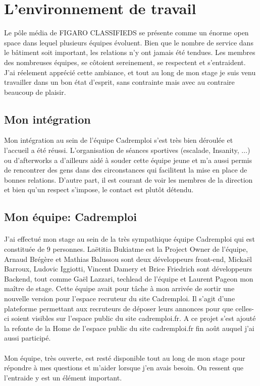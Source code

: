 \section{L'environnement de travail}
Le pôle média de FIGARO CLASSIFIEDS se présente comme un énorme open space dans lequel plusieurs équipes évoluent.
Bien que le nombre de service dans le bâtiment soit important, les relations n'y ont jamais été tendues.
Les membres des nombreuses équipes, se côtoient sereinement, se respectent et s'entraident.
J'ai réelement apprécié cette ambiance, et tout au long de mon stage je suis venu travailler dans un bon état d'esprit, sans contrainte mais avec au contraire beaucoup de plaisir.

\subsection{Mon intégration}
\label{sub:Mon intégration}
Mon intégration au sein de l'équipe Cadremploi s'est très bien déroulée et l'accueil a été réussi.
L'organisation de séances sportives (escalade, Insanity, ...) ou d'afterworks a d'ailleurs aidé à souder cette équipe jeune et m'a aussi permis de rencontrer des gens dans des circonstances qui facilitent la mise en place de bonnes relations.
D'autre part, il est courant de voir les membres de la direction et bien qu'un respect s'impose, le contact est plutôt détendu.

\subsection{Mon équipe: Cadremploi}
\label{sub:Mon équipe}
\paragraph{}
J'ai effectué mon stage au sein de la très sympathique équipe Cadremploi qui est constituée de 9 personnes. Laëtitia Bukiatme est la Project Owner de l'équipe, Arnaud Brégère et Mathias Balussou sont deux développeurs front-end, Mickaël Barroux, Ludovic Iggiotti, Vincent Damery et Brice Friedrich sont développeurs Backend, tout comme Gaël Lazzari, techlead de l'équipe et Laurent Pageon mon maître de stage.
Cette équipe avait pour tâche à mon arrivée de sortir une nouvelle version pour l'espace recruteur du site Cadremploi.
Il s'agit d'une plateforme permettant aux recruteurs de déposer leurs annonces pour que celles-ci soient visibles sur l'espace public du site cadremploi.fr.
A ce projet s'est ajouté la refonte de la Home de l'espace public du site cadremploi.fr fin août auquel j'ai aussi participé.
\paragraph{}
Mon équipe, très ouverte, est resté disponible tout au long de mon stage pour répondre à mes questions et m'aider lorsque j'en avais besoin.
On ressent que l'entraide y est un élément important.
